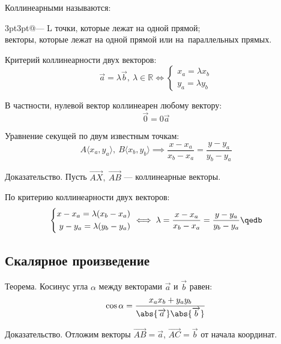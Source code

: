 {\bold Коллинеарными} называются:
\begin{tabularcx}{3pt}{3pt}{@{--- } L}{\textwidth}
{\ital точки}, которые лежат на одной прямой;\\
{\ital векторы}, которые лежат на одной прямой или на~параллельных прямых.
\end{tabularcx}
\begin{theorem}
{\bold Критерий коллинеарности} двух векторов:
$$\overrightarrow{a}=\lambda\overrightarrow{b},\ \lambda\in\mathbb{R}\iff\begin{cases}
x_a=\lambda x_b\\
y_a=\lambda y_b
\end{cases}$$ 
\end{theorem}
В частности, нулевой вектор коллинеарен {\ital любому} вектору:
$$\overrightarrow{0}=0\overrightarrow{a}$$
\begin{theorem}
{\bold Уравнение секущей} по двум известным точкам:
$$A\langle x_a,y_a\rangle,\ B\langle x_b,y_b\rangle\implies\frac{x-x_a}{x_b-x_a}=\frac{y-y_a}{y_b-y_a}$$
\end{theorem}
{\bold Доказательство.} Пусть $\overrightarrow{AX},\ \overrightarrow{AB}$ --- коллинеарные векторы.

По критерию коллинеарности двух векторов:
$$\left\{\begin{aligned}
x-x_a=\lambda(x_b-x_a)\\
y-y_a=\lambda(y_b-y_a)
\end{aligned}\right.\iff
\lambda=\frac{x-x_a}{x_b-x_a}=\frac{y-y_a}{y_b-y_a}\qedb$$

\subsection{Скалярное произведение}

\begin{theorem}
{\bold Теорема.} Косинус угла $\alpha$ между векторами $\overrightarrow{a}$ и $\overrightarrow{b}$ равен:
$$\cos\alpha=\frac{x_ax_b+y_ay_b}{\abs{\overrightarrow{a}}\abs{\overrightarrow{b}}}$$
\end{theorem}
{\bold Доказательство.} Отложим векторы $\overrightarrow{AB}=\overrightarrow{a}$, $\overrightarrow{AC}=\overrightarrow{b}$ от начала координат.

